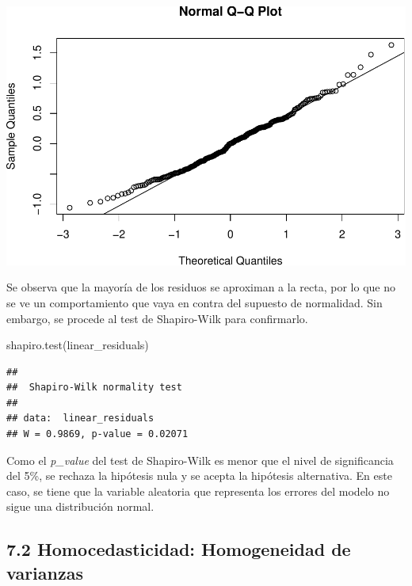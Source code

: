 \documentclass[
]{article}
\newenvironment{Shaded}{\begin{snugshade}}{\end{snugshade}}
\newcommand{\FunctionTok}[1]{\textcolor[rgb]{0.00,0.00,0.00}{#1}}
\newcommand{\NormalTok}[1]{#1}
\begin{document}
\includegraphics{A4_files/figure-latex/unnamed-chunk-33-1.pdf}

\vspace{0.3cm}

Se observa que la mayoría de los residuos se aproximan a la recta, por
lo que no se ve un comportamiento que vaya en contra del supuesto de
normalidad. Sin embargo, se procede al test de Shapiro-Wilk para
confirmarlo.

\vspace{0.3cm}

\begin{Shaded}
\begin{Highlighting}[]
\FunctionTok{shapiro.test}\NormalTok{(linear\_residuals)}
\end{Highlighting}
\end{Shaded}

\begin{verbatim}
## 
##  Shapiro-Wilk normality test
## 
## data:  linear_residuals
## W = 0.9869, p-value = 0.02071
\end{verbatim}

\vspace{0.3cm}

Como el \emph{p\_value} del test de Shapiro-Wilk es menor que el nivel
de significancia del 5\%, se rechaza la hipótesis nula y se acepta la
hipótesis alternativa. En este caso, se tiene que la variable aleatoria
que representa los errores del modelo no sigue una distribución normal.

\vspace{0.3cm}

\hypertarget{homocedasticidad-homogeneidad-de-varianzas}{%
\subsection{7.2 Homocedasticidad: Homogeneidad de
varianzas}\label{homocedasticidad-homogeneidad-de-varianzas}}
\end{document}
